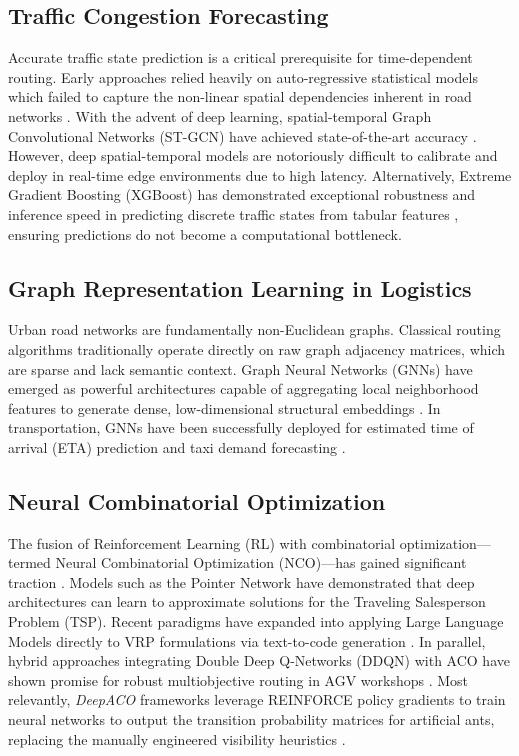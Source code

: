 \documentclass[conference]{IEEEtran}
\begin{document}
\subsection{Traffic Congestion Forecasting}
Accurate traffic state prediction is a critical prerequisite for time-dependent routing. Early approaches relied heavily on auto-regressive statistical models which failed to capture the non-linear spatial dependencies inherent in road networks \cite{arima_traffic}. With the advent of deep learning, spatial-temporal Graph Convolutional Networks (ST-GCN) have achieved state-of-the-art accuracy \cite{stgcn_traffic}. However, deep spatial-temporal models are notoriously difficult to calibrate and deploy in real-time edge environments due to high latency. Alternatively, Extreme Gradient Boosting (XGBoost) has demonstrated exceptional robustness and inference speed in predicting discrete traffic states from tabular features \cite{xgboost_traffic}, ensuring predictions do not become a computational bottleneck.

\subsection{Graph Representation Learning in Logistics}
Urban road networks are fundamentally non-Euclidean graphs. Classical routing algorithms traditionally operate directly on raw graph adjacency matrices, which are sparse and lack semantic context. Graph Neural Networks (GNNs) have emerged as powerful architectures capable of aggregating local neighborhood features to generate dense, low-dimensional structural embeddings \cite{gnn_survey}. In transportation, GNNs have been successfully deployed for estimated time of arrival (ETA) prediction and taxi demand forecasting \cite{gnn_eta}.

\subsection{Neural Combinatorial Optimization}
The fusion of Reinforcement Learning (RL) with combinatorial optimization—termed Neural Combinatorial Optimization (NCO)—has gained significant traction \cite{nco_bengio}. Models such as the Pointer Network have demonstrated that deep architectures can learn to approximate solutions for the Traveling Salesperson Problem (TSP). Recent paradigms have expanded into applying Large Language Models directly to VRP formulations via text-to-code generation \cite{llm_vrp_ref}. In parallel, hybrid approaches integrating Double Deep Q-Networks (DDQN) with ACO have shown promise for robust multiobjective routing in AGV workshops \cite{mdpi_aco}. Most relevantly, \textit{DeepACO} frameworks leverage REINFORCE policy gradients to train neural networks to output the transition probability matrices for artificial ants, replacing the manually engineered visibility heuristics \cite{deep_aco_ref}.
\end{document}
